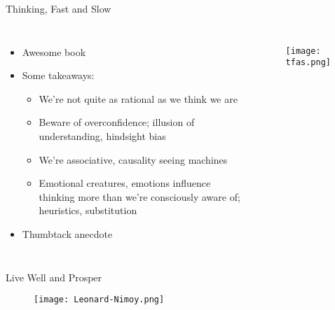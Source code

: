 \documentclass{beamer}
\begin{document}
\begin{frame}{Thinking, Fast and Slow}{}
\begin{columns}
\begin{itemize}
\addtolength{\itemsep}{0.5\baselineskip}
\item Awesome book
\item Some takeaways: 
  \begin{itemize}
  \addtolength{\itemsep}{0.5\baselineskip}
  \item We're not quite as rational as we think we are
  \item Beware of overconfidence; illusion of understanding, hindsight bias 
  \item We're associative, causality seeing machines
  \item Emotional creatures, emotions influence thinking more than we're consciously aware of; heuristics, substitution 
  \end{itemize}
  \item Thumbtack anecdote
\end{itemize}
    \begin{figure}[H]
  	\centering
  	\texttt{[image: tfas.png]}
  	\end{figure}
\end{columns}
\end{frame}

\begin{frame}{Live Well and Prosper}{}
    \begin{figure}[H]
  	\centering
  	\texttt{[image: Leonard-Nimoy.png]}
  	\end{figure}
\end{frame}
\end{document}
